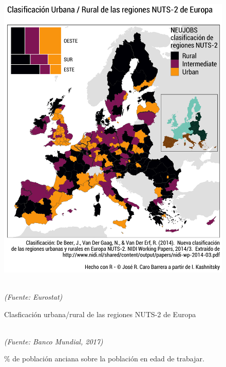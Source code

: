 \vspace{-0.3cm}

\begin{figure}[H]
\centering
\includegraphics[scale=0.15]{Cap1/urban.png}
\vspace{-0.2cm}
\caption{Clasficaci\'on urbana/rural de las regiones NUTS-2 de Europa}\\ 
\textit{(Fuente: Eurostat)}
\end{figure}

\begin{figure}[!ht]
\centering
\hspace*{-0.6cm}
\caption{\% de población anciana sobre la población en edad de trabajar.}\\
\textit{(Fuente: Banco Mundial, 2017)}
\end{figure}

